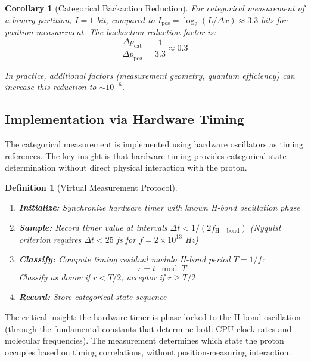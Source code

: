 \documentclass[twocolumn,10pt]{article}
\newtheorem{corollary}[theorem]{Corollary}
\newtheorem{definition}[theorem]{Definition}
\theoremstyle{remark}
\begin{document}
\begin{corollary}[Categorical Backaction Reduction]
For categorical measurement of a binary partition, $I = 1$ bit, compared to $I_{\mathrm{pos}} = \log_2(L/\Delta x) \approx 3.3$ bits for position measurement. The backaction reduction factor is:
\begin{equation}
\frac{\Delta p_{\mathrm{cat}}}{\Delta p_{\mathrm{pos}}} = \frac{1}{3.3} \approx 0.3
\end{equation}

In practice, additional factors (measurement geometry, quantum efficiency) can increase this reduction to $\sim$$10^{-6}$.
\end{corollary}

\subsection{Implementation via Hardware Timing}

The categorical measurement is implemented using hardware oscillators as timing references. The key insight is that hardware timing provides categorical state determination without direct physical interaction with the proton.

\begin{definition}[Virtual Measurement Protocol]
\label{def:virtual_measurement}
\begin{enumerate}
\item \textbf{Initialize:} Synchronize hardware timer with known H-bond oscillation phase
\item \textbf{Sample:} Record timer value at intervals $\Delta t < 1/(2f_{\mathrm{H-bond}})$ (Nyquist criterion requires $\Delta t < 25$ fs for $f = 2 \times 10^{13}$ Hz)
\item \textbf{Classify:} Compute timing residual modulo H-bond period $T = 1/f$:
\begin{equation}
r = t \mod T
\end{equation}
Classify as donor if $r < T/2$, acceptor if $r \geq T/2$
\item \textbf{Record:} Store categorical state sequence
\end{enumerate}
\end{definition}

The critical insight: the hardware timer is phase-locked to the H-bond oscillation (through the fundamental constants that determine both CPU clock rates and molecular frequencies). The measurement determines which state the proton occupies based on timing correlations, without position-measuring interaction.
\end{document}
